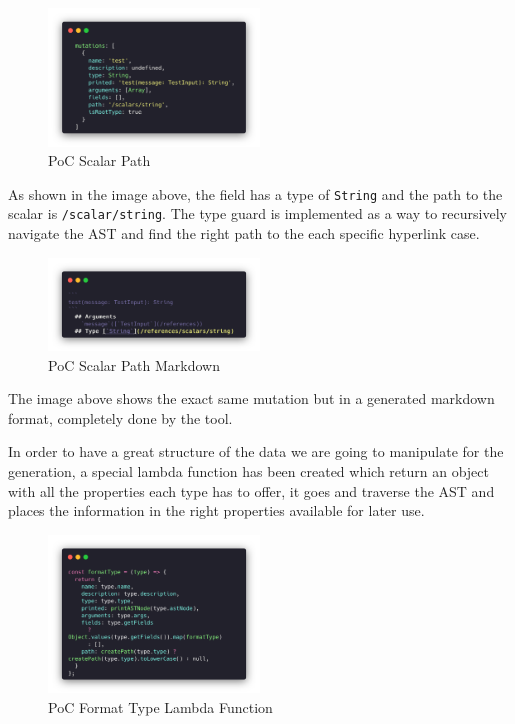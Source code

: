 \begin{figure}[H]
  \centering
  \includegraphics[width=0.5\textwidth]{figures/code/poc-scalar-type.png}
  \caption{PoC Scalar Path}
  \label{f:ch5-poc-scalar-path}
\end{figure}

As shown in the image above, the field has a type of \texttt{String} and the
path to the scalar is \texttt{/scalar/string}. The type guard is implemented as
a way to recursively navigate the AST and find the right path to the each
specific hyperlink case.

\begin{figure}[H]
  \centering
  \includegraphics[width=0.5\textwidth]{figures/code/poc-generated-path.png}
  \caption{PoC Scalar Path Markdown}
  \label{f:ch5-poc-scalar-path-markdown}
\end{figure}

The image above shows the exact same mutation but in a generated markdown format,
completely done by the tool.

In order to have a great structure of the data we are going to manipulate for
the generation, a special lambda function has been created which return an object
with all the properties each type has to offer, it goes and traverse the AST and
places the information in the right properties available for later use.

\begin{figure}[H]
  \centering
  \includegraphics[width=0.5\textwidth]{figures/code/poc-format-type.png}
  \caption{PoC Format Type Lambda Function}
  \label{f:ch5-poc-format-type-lambda-function}
\end{figure}

